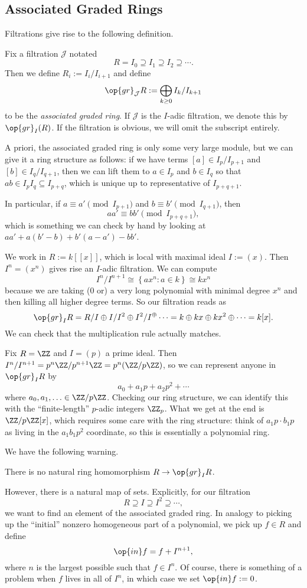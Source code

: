 \subsection{Associated Graded Rings}
Filtrations give rise to the following definition.
\begin{definition}
	Fix a filtration $\mathcal J$ notated
	\[R= I_0\supseteq I_1\supseteq I_2\supseteq\cdots.\]
	Then we define $R_i:=I_i/I_{i+1}$ and define
	\[\op{gr}_{\mathcal J}R:=\bigoplus_{k\ge0}I_k/I_{k+1}\]
	to be the \textit{associated graded ring}. If $\mathcal J$ is the $I$-adic filtration, we denote this by $\op{gr}_I(R)$. If the filtration is obvious, we will omit the subscript entirely.
\end{definition}
A priori, the associated graded ring is only some very large module, but we can give it a ring structure as follows: if we have terms $[a]\in I_p/I_{p+1}$ and $[b]\in I_q/I_{q+1}$, then we can lift them to $a\in I_p$ and $b\in I_q$ so that $ab\in I_pI_q\subseteq I_{p+q}$, which is unique up to representative of $I_{p+q+1}$.

In particular, if $a\equiv a'\pmod{I_{p+1}}$ and $b\equiv b'\pmod{I_{q+1}}$, then
\[aa'\equiv bb'\pmod{I_{p+q+1}},\]
which is something we can check by hand by looking at $aa'+a(b'-b)+b'(a-a')-bb'$.
\begin{example}
	We work in $R:=k[[x]]$, which is local with maximal ideal $I:=(x)$. Then $I^n=\left(x^n\right)$ gives rise an $I$-adic filtration. We can compute
	\[I^n/I^{n+1}\cong\left\{ax^n:a\in k\right\}\cong kx^n\]
	because we are taking ($0$ or) a very long polynomial with minimal degree $x^n$ and then killing all higher degree terms. So our filtration reads as
	\[\op{gr}_IR=R/I\oplus I/I^2\oplus I^2/I^\oplus\cdots=k\oplus kx\oplus kx^2\oplus\cdots=k[x].\]
	We can check that the multiplication rule actually matches.
\end{example}
\begin{example}
	Fix $R=\ZZ$ and $I=(p)$ a prime ideal. Then $I^n/I^{n+1}=p^n\ZZ/p^{n+1}\ZZ=p^n(\ZZ/p\ZZ)$, so we can represent anyone in $\op{gr}_IR$ by
	\[a_0+a_1p+a_2p^2+\cdots\]
	where $a_0,a_1,\ldots\in\ZZ/p\ZZ$. Checking our ring structure, we can identify this with the ``finite-length'' $p$-adic integers $\ZZ_p$. What we get at the end is $\ZZ/p\ZZ[x]$, which requires some care with the ring structure: think of $a_1p\cdot b_1p$ as living in the $a_1b_1p^2$ coordinate, so this is essentially a polynomial ring.
\end{example}
We have the following warning.
\begin{warn}
	There is no natural ring homomorphism $R\to\op{gr}_IR$.
\end{warn}
However, there is a natural map of sets. Explicitly, for our filtration
\[R\supseteq I\supseteq I^2\supseteq\cdots,\]
we want to find an element of the associated graded ring. In analogy to picking up the ``initial'' nonzero homogeneous part of a polynomial, we pick up $f\in R$ and define
\[\op{in}f=f+I^{n+1},\]
where $n$ is the largest possible such that $f\in I^n$. Of course, there is something of a problem when $f$ lives in all of $I^n$, in which case we set $\op{in}f:=0$.

